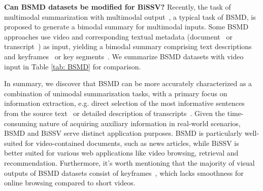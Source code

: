 \textbf{Can BSMD datasets be modified for BiSSV?} Recently, the task of multimodal summarization with multimodal output~\cite{zhu2018msmo}, a typical task of BSMD, is proposed to generate a bimodal summary for multimodal inputs. Some BSMD approaches use video and corresponding textual metadata (document~\cite{li2020vmsmo,fu2020multi, tang2023tldw} or transcript~\cite{fu2020multi,he2023align,qiu2023multisum}) as input, yielding a bimodal summary comprising text descriptions and keyframes~\cite{li2020vmsmo,fu2020multi,tang2023tldw,qiu2023multisum} or key segments~\cite{he2023align}. We summarize BSMD datasets with video input in Table \ref{tab: BSMD} for comparison. 

In summary, we discover that BSMD can be more accurately characterized as a combination of unimodal summarization tasks, with a primary focus on information extraction, e.g. direct selection of the most informative sentences from the source text~\cite{he2023align} or detailed description of transcripts~\cite{qiu2023multisum}. Given the time-consuming nature of acquiring auxiliary information in real-world scenarios, BSMD and BiSSV serve distinct application purposes. BSMD is particularly well-suited for video-contained documents, such as news articles, while BiSSV is better suited for various web applications like video browsing, retrieval and recommendation. Furthermore, it's worth mentioning that the majority of visual outputs of BSMD datasets consist of keyframes~\cite{li2020vmsmo,fu2020multi,tang2023tldw,qiu2023multisum}, which lacks smoothness for online browsing compared to short videos.

